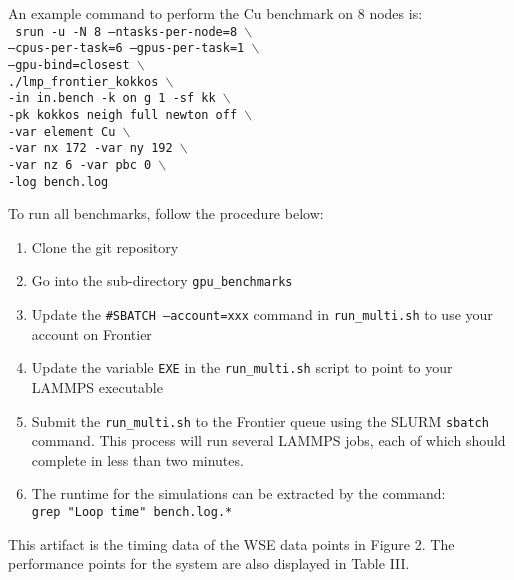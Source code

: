 \documentclass[conference]{IEEEtran}
\begin{document}
An example command to perform the Cu benchmark on 8 nodes is: \\
\texttt{%
\phantom{xxx}srun -u -N 8 --ntasks-per-node=8 $\backslash$ \\
 \phantom{xxxxx}--cpus-per-task=6 --gpus-per-task=1 $\backslash$ \\
 \phantom{xxxxx}--gpu-bind=closest $\backslash$ \\
 \phantom{xxxxx}./lmp\_frontier\_kokkos $\backslash$ \\
 \phantom{xxxxx}-in in.bench -k on g 1 -sf kk $\backslash$ \\
 \phantom{xxxxx}-pk kokkos neigh full newton off $\backslash$ \\
\phantom{xxxxx}-var element Cu $\backslash$ \\
\phantom{xxxxx}-var nx 172 -var ny 192 $\backslash$ \\
\phantom{xxxxx}-var nz 6 -var pbc 0 $\backslash$ \\
\phantom{xxxxx}-log bench.log
}

To run all benchmarks, follow the procedure below:
\begin{enumerate}
\item	Clone the git repository\\ \phantom{xxx}\gitrepo %
\item	Go into the sub-directory \texttt{gpu\_benchmarks}

\item	Update the \texttt{\#SBATCH --account=xxx} command in \texttt{run\_multi.sh} to use your account on Frontier

\item Update the variable \texttt{EXE} in the \texttt{run\_multi.sh} script to point to your LAMMPS executable

\item Submit the \texttt{run\_multi.sh} to the Frontier queue using the SLURM \texttt{sbatch} command. This process will run several LAMMPS jobs, each of which should complete in less than two minutes.

\item	The runtime for the simulations can be extracted by the command:\\
     \phantom{xxx}\texttt{grep "Loop time" bench.log.*}
\end{enumerate}

\newartifact

\artrel

This artifact is the timing data of the WSE data points in Figure 2. The performance points for the system are also displayed in Table III.
\end{document}
